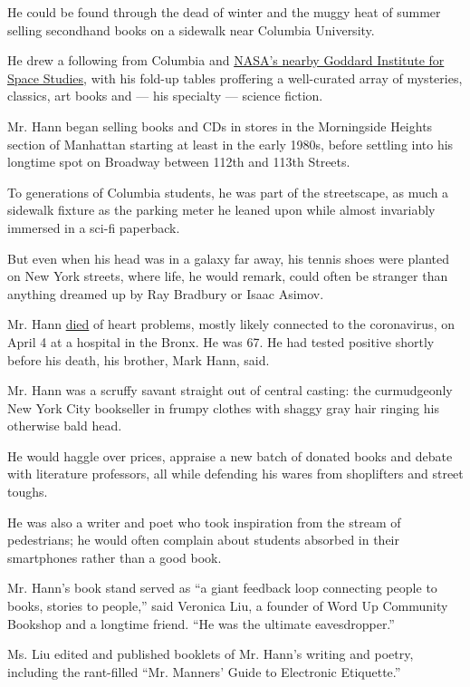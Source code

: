 He could be found through the dead of winter and the muggy heat of
summer selling secondhand books on a sidewalk near Columbia University.

He drew a following from Columbia and
\href{https://www.giss.nasa.gov/about/}{NASA's nearby Goddard Institute
for Space Studies}, with his fold-up tables proffering a well-curated
array of mysteries, classics, art books and --- his specialty ---
science fiction.

Mr. Hann began selling books and CDs in stores in the Morningside
Heights section of Manhattan starting at least in the early 1980s,
before settling into his longtime spot on Broadway between 112th and
113th Streets.

To generations of Columbia students, he was part of the streetscape, as
much a sidewalk fixture as the parking meter he leaned upon while almost
invariably immersed in a sci-fi paperback.

But even when his head was in a galaxy far away, his tennis shoes were
planted on New York streets, where life, he would remark, could often be
stranger than anything dreamed up by Ray Bradbury or Isaac Asimov.

Mr. Hann
\href{https://www.westsiderag.com/2020/04/22/steven-hann-bookseller-and-poet-of-morningside-heights-dies}{died}
of heart problems, mostly likely connected to the coronavirus, on April
4 at a hospital in the Bronx. He was 67. He had tested positive shortly
before his death, his brother, Mark Hann, said.

Mr. Hann was a scruffy savant straight out of central casting: the
curmudgeonly New York City bookseller in frumpy clothes with shaggy gray
hair ringing his otherwise bald head.

He would haggle over prices, appraise a new batch of donated books and
debate with literature professors, all while defending his wares from
shoplifters and street toughs.

He was also a writer and poet who took inspiration from the stream of
pedestrians; he would often complain about students absorbed in their
smartphones rather than a good book.

Mr. Hann's book stand served as ``a giant feedback loop connecting
people to books, stories to people,'' said Veronica Liu, a founder of
Word Up Community Bookshop and a longtime friend. ``He was the ultimate
eavesdropper.''

Ms. Liu edited and published booklets of Mr. Hann's writing and poetry,
including the rant-filled ``Mr. Manners' Guide to Electronic
Etiquette.''

